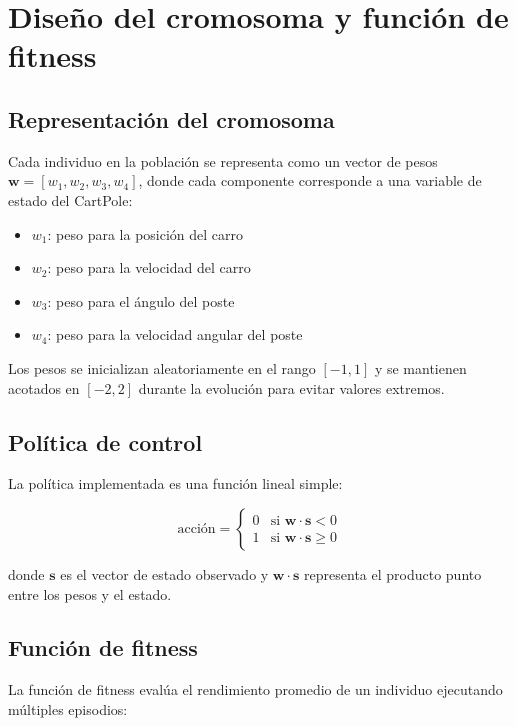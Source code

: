 \documentclass[12pt,a4paper]{article}
\begin{document}
\section{Diseño del cromosoma y función de fitness}

\subsection{Representación del cromosoma}
Cada individuo en la población se representa como un vector de pesos 
$\mathbf{w} = [w_1, w_2, w_3, w_4]$, donde cada componente corresponde a una variable de estado del CartPole:

\begin{itemize}
    \item $w_1$: peso para la posición del carro
    \item $w_2$: peso para la velocidad del carro
    \item $w_3$: peso para el ángulo del poste
    \item $w_4$: peso para la velocidad angular del poste
\end{itemize}

Los pesos se inicializan aleatoriamente en el rango $[-1, 1]$ y se mantienen acotados en $[-2, 2]$ durante la evolución para evitar valores extremos.

\subsection{Política de control}
La política implementada es una función lineal simple:

\begin{equation}
\text{acción} =
\begin{cases}
0 & \text{si } \mathbf{w} \cdot \mathbf{s} < 0 \\
1 & \text{si } \mathbf{w} \cdot \mathbf{s} \geq 0
\end{cases}
\end{equation}

donde $\mathbf{s}$ es el vector de estado observado y $\mathbf{w} \cdot \mathbf{s}$ representa el producto punto entre los pesos y el estado.

\subsection{Función de fitness}
La función de fitness evalúa el rendimiento promedio de un individuo ejecutando múltiples episodios:
\end{document}
